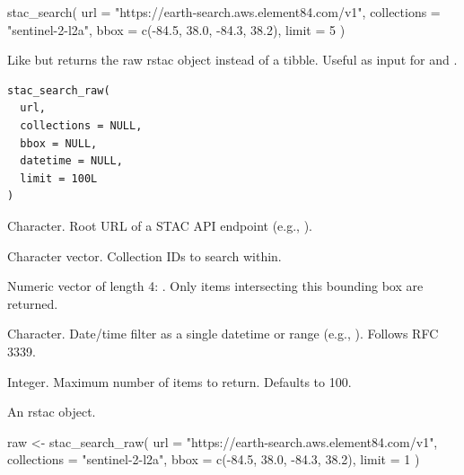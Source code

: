 \documentclass[a4paper]{book}
\begin{document}
%
\begin{Examples}
\begin{ExampleCode}


stac_search(
  url = "https://earth-search.aws.element84.com/v1",
  collections = "sentinel-2-l2a",
  bbox = c(-84.5, 38.0, -84.3, 38.2),
  limit = 5
)


\end{ExampleCode}
\end{Examples}
%
\begin{Description}
Like  but returns the raw rstac  object
instead of a tibble. Useful as input for  and
.
\end{Description}
%
\begin{Usage}
\begin{verbatim}
stac_search_raw(
  url,
  collections = NULL,
  bbox = NULL,
  datetime = NULL,
  limit = 100L
)
\end{verbatim}
\end{Usage}
%
\begin{Arguments}
\begin{ldescription}
\item[\code{url}] Character. Root URL of a STAC API endpoint
(e.g., ).

\item[\code{collections}] Character vector. Collection IDs to search within.

\item[\code{bbox}] Numeric vector of length 4: .
Only items intersecting this bounding box are returned.

\item[\code{datetime}] Character. Date/time filter as a single datetime or
range (e.g., ). Follows RFC 3339.

\item[\code{limit}] Integer. Maximum number of items to return. Defaults to 100.
\end{ldescription}
\end{Arguments}
%
\begin{Value}
An rstac  object.
\end{Value}
%
\begin{Examples}
\begin{ExampleCode}


raw <- stac_search_raw(
  url = "https://earth-search.aws.element84.com/v1",
  collections = "sentinel-2-l2a",
  bbox = c(-84.5, 38.0, -84.3, 38.2),
  limit = 1
)


\end{ExampleCode}
\end{Examples}
\end{document}
